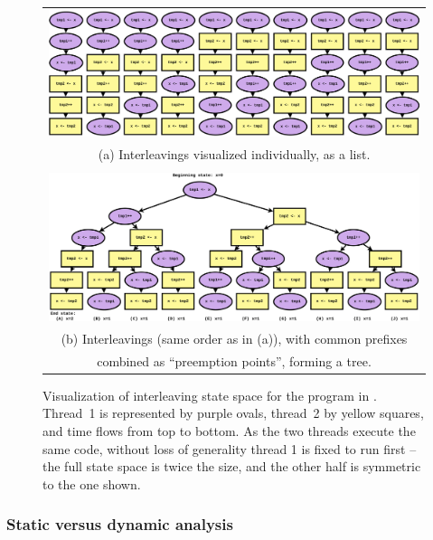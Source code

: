 \begin{figure}[p]
	\begin{tabular}{c}
		\includegraphics[width=\textwidth]{statespace-list.pdf}
		\\
		(a) Interleavings visualized individually, as a list.
		\\
		\\
		\includegraphics[width=\textwidth]{statespace-tree.pdf}
		\\
		(b) Interleavings (same order as in (a)), with common prefixes \\
		combined as ``preemption points'', forming a tree.
	\end{tabular}
	\caption[Visualization of interleaving state space for the program in .]
		{Visualization of interleaving state space for the program in .
	Thread~1 is represented by purple ovals, thread~2 by yellow squares, and time flows from top to bottom.
	As the two threads execute the same code, without loss of generality thread 1 is fixed to run first --
	the full state space is twice the size, and the other half is symmetric to the one shown.}
	\label{fig:tree}
\end{figure}

\subsubsection{Static versus dynamic analysis}

